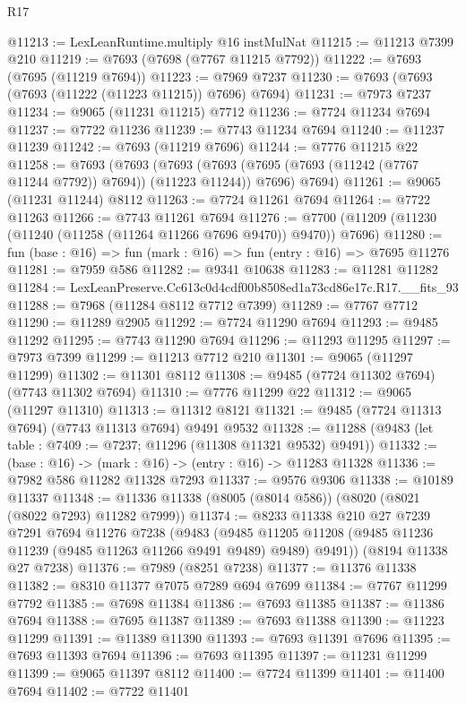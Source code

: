 \begin{lexlean}{R17}
\begin{coremodule}
@11213 := LexLeanRuntime.multiply @16 instMulNat
@11215 := @11213 @7399 @210
@11219 := @7693 (@7698 (@7767 @11215 @7792))
@11222 := @7693 (@7695 (@11219 @7694))
@11223 := @7969 @7237
@11230 := @7693 (@7693 (@7693 (@11222 (@11223 @11215)) @7696) @7694)
@11231 := @7973 @7237
@11234 := @9065 (@11231 @11215) @7712
@11236 := @7724 @11234 @7694
@11237 := @7722 @11236
@11239 := @7743 @11234 @7694
@11240 := @11237 @11239
@11242 := @7693 (@11219 @7696)
@11244 := @7776 @11215 @22
@11258 := @7693
    (@7693
      (@7693 (@7693 (@7695 (@7693 (@11242 (@7767 @11244 @7792)) @7694)) (@11223 @11244)) @7696)
      @7694)
@11261 := @9065 (@11231 @11244) @8112
@11263 := @7724 @11261 @7694
@11264 := @7722 @11263
@11266 := @7743 @11261 @7694
@11276 := @7700 (@11209 (@11230 (@11240 (@11258 (@11264 @11266 @7696 @9470)) @9470)) @7696)
@11280 := fun (base : @16) => fun (mark : @16) => fun (entry : @16) => @7695 @11276
@11281 := @7959 @586
@11282 := @9341 @10638
@11283 := @11281 @11282
@11284 := LexLeanPreserve.Cc613c0d4cdf00b8508ed1a73cd86e17c.R17.__fits_93
@11288 := @7968 (@11284 @8112 @7712 @7399)
@11289 := @7767 @7712
@11290 := @11289 @2905
@11292 := @7724 @11290 @7694
@11293 := @9485 @11292
@11295 := @7743 @11290 @7694
@11296 := @11293 @11295
@11297 := @7973 @7399
@11299 := @11213 @7712 @210
@11301 := @9065 (@11297 @11299)
@11302 := @11301 @8112
@11308 := @9485 (@7724 @11302 @7694) (@7743 @11302 @7694)
@11310 := @7776 @11299 @22
@11312 := @9065 (@11297 @11310)
@11313 := @11312 @8121
@11321 := @9485 (@7724 @11313 @7694) (@7743 @11313 @7694) @9491 @9532
@11328 := @11288 (@9483 (let table : @7409 := @7237; @11296 (@11308 @11321 @9532) @9491))
@11332 := (base : @16) -> (mark : @16) -> (entry : @16) -> @11283 @11328
@11336 := @7982 @586 @11282 @11328 @7293
@11337 := @9576 @9306
@11338 := @10189 @11337
@11348 := @11336 @11338 (@8005 (@8014 @586)) (@8020 (@8021 (@8022 @7293) @11282 @7999))
@11374 := @8233
    @11338
    @210
    @27
    @7239
    @7291
    @7694
    @11276
    @7238
    (@9483
      (@9485 @11205 @11208 (@9485 @11236 @11239 (@9485 @11263 @11266 @9491 @9489) @9489) @9491))
    (@8194 @11338 @27 @7238)
@11376 := @7989 (@8251 @7238)
@11377 := @11376 @11338
@11382 := @8310 @11377 @7075 @7289 @694 @7699
@11384 := @7767 @11299 @7792
@11385 := @7698 @11384
@11386 := @7693 @11385
@11387 := @11386 @7694
@11388 := @7695 @11387
@11389 := @7693 @11388
@11390 := @11223 @11299
@11391 := @11389 @11390
@11393 := @7693 @11391 @7696
@11395 := @7693 @11393 @7694
@11396 := @7693 @11395
@11397 := @11231 @11299
@11399 := @9065 @11397 @8112
@11400 := @7724 @11399
@11401 := @11400 @7694
@11402 := @7722 @11401

\end{coremodule}
\end{lexlean}
